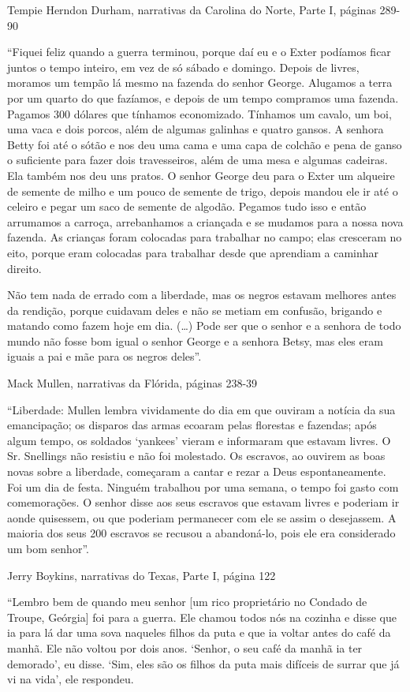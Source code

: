 Tempie Herndon Durham, narrativas da Carolina do Norte, Parte I, páginas
289-90

``Fiquei feliz quando a guerra terminou, porque daí eu e o Exter
podíamos ficar juntos o tempo inteiro, em vez de só sábado e domingo.
Depois de livres, moramos um tempão lá mesmo na fazenda do senhor
George. Alugamos a terra por um quarto do que fazíamos, e depois de um
tempo compramos uma fazenda. Pagamos 300 dólares que tínhamos
economizado. Tínhamos um cavalo, um boi, uma vaca e dois porcos, além de
algumas galinhas e quatro gansos. A senhora Betty foi até o sótão e nos
deu uma cama e uma capa de colchão e pena de ganso o suficiente para
fazer dois travesseiros, além de uma mesa e algumas cadeiras. Ela também
nos deu uns pratos. O senhor George deu para o Exter um alqueire de
semente de milho e um pouco de semente de trigo, depois mandou ele ir
até o celeiro e pegar um saco de semente de algodão. Pegamos tudo isso e
então arrumamos a carroça, arrebanhamos a criançada e se mudamos para a
nossa nova fazenda. As crianças foram colocadas para trabalhar no campo;
elas cresceram no eito, porque eram colocadas para trabalhar desde que
aprendiam a caminhar direito.

Não tem nada de errado com a liberdade, mas os negros estavam melhores
antes da rendição, porque cuidavam deles e não se metiam em confusão,
brigando e matando como fazem hoje em dia. (\ldots{}) Pode ser que o
senhor e a senhora de todo mundo não fosse bom igual o senhor George e a
senhora Betsy, mas eles eram iguais a pai e mãe para os negros deles''.

Mack Mullen, narrativas da Flórida, páginas 238-39

``Liberdade: Mullen lembra vividamente do dia em que ouviram a notícia
da sua emancipação; os disparos das armas ecoaram pelas florestas e
fazendas; após algum tempo, os soldados `yankees' vieram e informaram
que estavam livres. O Sr. Snellings não resistiu e não foi molestado. Os
escravos, ao ouvirem as boas novas sobre a liberdade, começaram a cantar
e rezar a Deus espontaneamente. Foi um dia de festa. Ninguém trabalhou
por uma semana, o tempo foi gasto com comemorações. O senhor disse aos
seus escravos que estavam livres e poderiam ir aonde quisessem, ou que
poderiam permanecer com ele se assim o desejassem. A maioria dos seus
200 escravos se recusou a abandoná-lo, pois ele era considerado um bom
senhor''.

Jerry Boykins, narrativas do Texas, Parte I, página 122

``Lembro bem de quando meu senhor {[}um rico proprietário no Condado de
Troupe, Geórgia{]} foi para a guerra. Ele chamou todos nós na cozinha e
disse que ia para lá dar uma sova naqueles filhos da puta e que ia
voltar antes do café da manhã. Ele não voltou por dois anos. `Senhor, o
seu café da manhã ia ter demorado', eu disse. `Sim, eles são os filhos
da puta mais difíceis de surrar que já vi na vida', ele respondeu.

